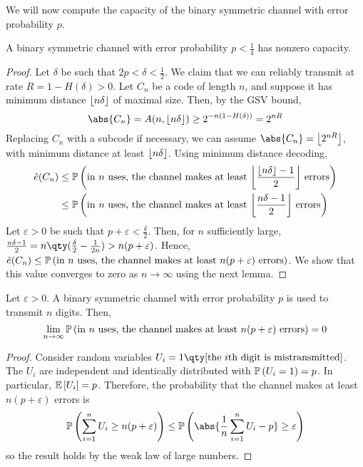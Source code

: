 We will now compute the capacity of the binary symmetric channel with error probability $p$.
\begin{proposition}
    A binary symmetric channel with error probability $p < \frac{1}{4}$ has nonzero capacity.
\end{proposition}
\begin{proof}
    Let $\delta$ be such that $2p < \delta < \frac{1}{2}$.
    We claim that we can reliably transmit at rate $R = 1 - H(\delta) > 0$.
    Let $C_n$ be a code of length $n$, and suppose it has minimum distance $\floor*{n\delta}$ of maximal size.
    Then, by the GSV bound,
    \[ \abs{C_n} = A(n, \floor*{n\delta}) \geq 2^{-n(1-H(\delta))} = 2^{nR} \]
    Replacing $C_n$ with a subcode if necessary, we can assume $\abs{C_n} = \floor*{2^{nR}}$, with minimum distance at least $\floor*{n\delta}$.
    Using minimum distance decoding,
    \begin{align*}
        \hat e(C_n) &\leq \prob{\text{in $n$ uses, the channel makes at least } \floor*{\frac{\floor*{n\delta}-1}{2}} \text{ errors}} \\
        &\leq \prob{\text{in $n$ uses, the channel makes at least } \floor*{\frac{n\delta - 1}{2}} \text{ errors}}
    \end{align*}
    Let $\varepsilon > 0$ be such that $p + \varepsilon < \frac{\delta}{2}$.
    Then, for $n$ sufficiently large, $\frac{n\delta - 1}{2} = n\qty(\frac{\delta}{2} - \frac{1}{2n}) > n(p + \varepsilon)$.
    Hence, $\hat e(C_n) \leq \prob{\text{in $n$ uses, the channel makes at least } n(p+\varepsilon) \text{ errors}}$.
    We show that this value converges to zero as $n \to \infty$ using the next lemma.
\end{proof}
\begin{lemma}
    Let $\varepsilon > 0$.
    A binary symmetric channel with error probability $p$ is used to transmit $n$ digits.
    Then,
    \[ \lim_{n \to \infty} \prob{\text{in $n$ uses, the channel makes at least $n(p + \varepsilon)$ errors}} = 0 \]
\end{lemma}
\begin{proof}
    Consider random variables $U_i = 1\qty[\text{the $i$th digit is mistransmitted}]$.
    The $U_i$ are independent and identically distributed with $\prob{U_i = 1} = p$.
    In particular, $\expect{U_i} = p$.
    Therefore, the probability that the channel makes at least $n(p + \varepsilon)$ errors is
    \[ \prob{\sum_{i=1}^n U_i \geq n(p + \varepsilon)} \leq \prob{\abs{\frac{1}{n} \sum_{i=1}^n U_i - p} \geq \varepsilon} \]
    so the result holds by the weak law of large numbers.
\end{proof}

